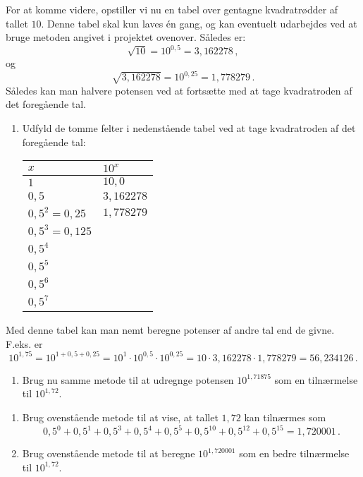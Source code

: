 \documentclass[12pt,oneside,a4paper]{article}
\theoremstyle{plain}
\begin{document}
For at komme videre, opstiller vi nu en tabel over gentagne kvadratrødder af tallet
$10$. Denne tabel skal kun laves én gang, og kan eventuelt udarbejdes ved at
bruge metoden angivet i projektet ovenover.  Således er:
\[
    \sqrt{10} = 10^{0,5} = 3,162278 \,,
\]
og
\[
    \sqrt{3,162278} = 10^{0,25} = 1,778279 \,.
\]
Således kan man halvere potensen ved at fortsætte med at tage kvadratroden af
det foregående tal.

\begin{enumerate}[label=(\alph*), resume]
    \item Udfyld de tomme felter i nedenstående tabel ved at tage kvadratroden
        af det foregående tal:
        \begin{center}
            \begin{tabular}{|l|l|}
\hline
                $x$ & $10^x$ \\
                \hline
                $1$ & $10,0$ \\
                \hline
                $0,5$ & $3,162278$ \\
                \hline
                $0,5^2 = 0,25$ & $1,778279$ \\
                \hline
                $0,5^3 = 0,125$ &  \\
                \hline
                $0,5^4$ & \\
                \hline
                $0,5^5$ & \\
                \hline
                $0,5^6$ & \\
                \hline
                $0,5^7$ & \\
                \hline
            \end{tabular}
        \end{center}
\end{enumerate}

Med denne tabel kan man nemt beregne potenser af andre tal end de givne. F.eks. er 
\[
    10^{1,75} = 10^{1+0,5+0,25} = 10^1 \cdot 10^{0,5} \cdot 10^{0,25}
    = 10 \cdot 3,162278 \cdot 1,778279 = 56,234126 \,.
\]

\begin{enumerate}[label=(\alph*), resume]
    \item Brug nu samme metode til at udregnge potensen $10^{1,71875}$ som en
        tilnærmelse til $10^{1,72}$.
\end{enumerate}

\begin{enumerate}[label=(\alph*), resume]
    \item Brug ovenstående metode til at vise, at tallet $1,72$ kan tilnærmes som
        \[
            0,5^0 + 0,5^1 + 0,5^3 + 0,5^4 + 0,5^5 + 0,5^{10} + 0,5^{12} + 0,5^{15} = 1,720001 \,.
        \]
\item Brug ovenstående metode til at beregne $10^{1,720001}$ som en bedre
        tilnærmelse til $10^{1,72}$.
\end{enumerate}
\end{document}

